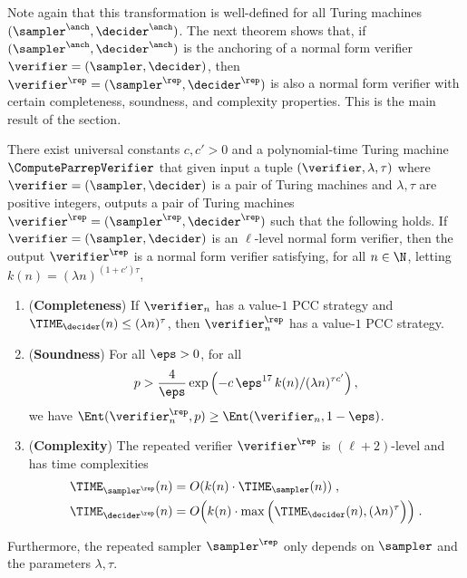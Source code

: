 Note again that this transformation is well-defined for all Turing machines $(\sanch,\danch)$. The next theorem shows that, if $(\sanch,\danch)$ is the anchoring of a normal form verifier $\verifier = (\sampler,\decider)$, then $\verifier^\rep = (\sampler^\rep,\decider^\rep)$ is also a normal form verifier with certain completeness, soundness, and complexity properties. This is the main result of the section.






\begin{theorem}
  \label{thm:repetition}
  There exist universal constants $c,c' > 0$ and a polynomial-time Turing machine
  $\ComputeParrepVerifier$ that given input a tuple $(\verifier,\lambda,\tau)$ where $\verifier = (\sampler,\decider)$ is a pair of Turing machines and $\lambda,\tau$ are positive integers, 
  outputs a pair of Turing machines $\verifier^\rep = (\sampler^\rep,
  \decider^\rep)$ 
  such that the following holds.
	If $\verifier = (\sampler,\decider)$ is an $\ell$-level normal form verifier, then the output $\verifier^\rep$ 
	is a normal form verifier satisfying, for all $n \in \N$, letting $k(n) = (\lambda n)^{(1+c')\tau}$, 
\begin{enumerate}
	\item \label{enu:pr-completeness} (\textbf{Completeness}) If $\verifier_n$ has
    a value-$1$ PCC strategy and $\TIME_\decider(n) \leq (\lambda n)^\tau$, then $\verifier^{\rep}_n$ has a value-$1$ PCC
    strategy.

  \item \label{enu:pr-soundness} (\textbf{Soundness}) For all $\eps > 0$, for
    all
    \begin{equation*}
      p > \frac{4}{\eps} \exp \left ( - c \, \eps^{17} \, k(n)/(\lambda n)^{\tau c'} \right), \end{equation*}
	we have $\Ent(\verifier^\rep_n, p) \geq \Ent(\verifier_n, 1 - \eps)$.


  \item \label{enu:pr-complexity} (\textbf{Complexity}) The repeated verifier
    $\verifier^\rep$ is $(\ell+2)$-level and has time complexities
    \begin{align*}
      \TIME_{\sampler^\rep}(n) & = O(k(n) \cdot \TIME_\sampler(n))\;,\\
      \TIME_{\decider^\rep}(n) & = O \Big(k(n) \cdot \max \Big(\TIME_\decider(n) ,  (\lambda n)^\tau \Big) \Big)\;.
    \end{align*}
  \end{enumerate}
  Furthermore, the repeated sampler $\sampler^\rep$ only depends on $\sampler$ and the parameters $\lambda,\tau$.
\end{theorem}

